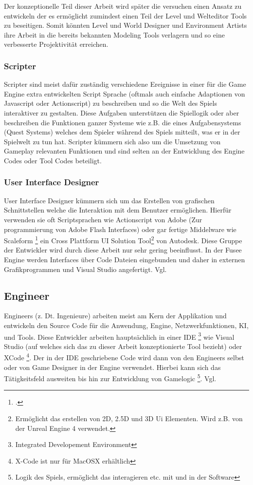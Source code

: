 \documentclass[pagesize, paper=a4, fontsize=12pt, titlepage=true, headings=small, headnosepline, abstractoff, liststotoc, nochapterprefix, plainheadsepline, twoside]{scrreprt}
\begin{document}
Der konzeptionelle Teil dieser Arbeit wird später die versuchen einen Ansatz zu entwickeln der es ermöglicht zumindest einen Teil der Level und Welteditor Tools zu beseitigen. Somit könnten Level und World Designer und Environment Artists ihre Arbeit in die bereits bekannten Modeling Tools verlagern und so eine verbesserte Projektivität erreichen.

\subsubsection{Scripter}
Scripter sind meist dafür zuständig verschiedene Ereignisse in einer für die Game Engine extra entwickelten Script Sprache (oftmals auch einfache Adaptionen von Javascript oder Actionscript) zu beschreiben und so die Welt des Spiels interaktiver zu gestalten. Diese Aufgaben unterstützen die Spiellogik oder aber beschreiben die Funktionen ganzer Systeme wie z.B. die eines Aufgabensystems (Quest Systems) welches dem Spieler während des Spiels mitteilt, was er in der Spielwelt zu tun hat. Scripter kümmern sich also um die Umsetzung von Gameplay relevanten Funktionen und sind selten an der Entwicklung des Engine Codes oder Tool Codes beteiligt.

\subsubsection{User Interface Designer}
User Interface Designer kümmern sich um das Erstellen von grafischen Schnittstellen welche die Interaktion mit dem Benutzer ermöglichen. Hierfür verwenden sie oft Scriptsprachen wie Actionscript von Adobe (Zur programmierung von Adobe Flash Interfaces) oder gar fertige Middelware wie Scaleform \footcite{AutodeskScale2014} ein Cross Plattform UI Solution Tool\footnote{Ermöglicht das erstellen von 2D, 2.5D und 3D Ui Elementen. Wird z.B. von der Unreal Engine 4 verwendet.} von Autodesk. Diese Gruppe der Entwickler wird durch diese Arbeit nur sehr gering beeinflusst. In der Fusee Engine werden Interfaces über Code Dateien eingebunden und daher in externen Grafikprogrammen und Visual Studio angefertigt. Vgl. \parencite[S. 31]{Chandler2006}

\subsection{Engineer}
Engineers (z. Dt. Ingenieure) arbeiten meist am Kern der Applikation und entwickeln den Source Code für die Anwendung, Engine, Netzwerkfunktionen, KI, und Tools. Diese Entwickler arbeiten hauptsächlich in einer IDE \footnote{Integrated Developement Environment} wie Visual Studio (auf welches sich das zu dieser Arbeit konzeptionierte Tool bezieht) oder XCode \footnote{X-Code ist nur für MacOSX erhältlich}. Der in der IDE geschriebene Code wird dann von den Engineers selbst oder von Game Designer in der Engine verwendet. Hierbei kann sich das Tätigkeitsfeld ausweiten bis hin zur Entwicklung von Gamelogic \footnote{Logik des Spiels, ermöglicht das interagieren etc. mit und in der Software}. Vgl. \parencite[S. 26]{Chandler2006}
\end{document}

